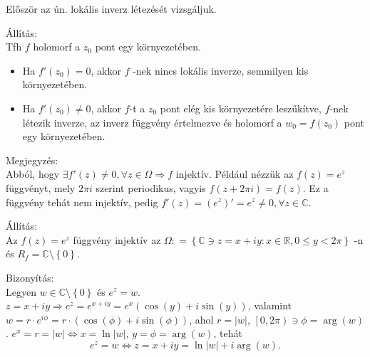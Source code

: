 \documentclass[12pt,a4paper]{scrartcl}
\providecommand{\tightlist}{%
  \setlength{\itemsep}{0pt}\setlength{\parskip}{0pt}}
\newenvironment{bizonyitas}{}{}
\newenvironment{allitas}{}{}
\newenvironment{megjegyzes}{}{}
\begin{document}
Először az ún. lokális inverz létezését vizsgáljuk.

\begin{allitas}

Állítás:\\
Tfh \(f\) holomorf a \(z_{0}\) pont egy környezetében.

\begin{itemize}
\tightlist
\item
  Ha \(f'\left( z_{0} \right) = 0\), akkor \(f\) -nek nincs lokális
  inverze, semmilyen kis környezetében.
\item
  Ha \(f'\left( z_{0} \right) \neq 0\), akkor \(f\)-t a \(z_{0}\) pont
  elég kis környezetére leszűkítve, \(f\)-nek létezik inverze, az inverz
  függvény értelmezve és holomorf a \(w_{0} = f\left( z_{0} \right)\)
  pont egy környezetében.
\end{itemize}

\end{allitas}

\begin{megjegyzes}

Megjegyzés:\\
Abból, hogy
\(\exists f'\left( z \right) \neq 0,\forall z \in \Omega\Rightarrow f\)
injektív. Például nézzük az \(f\left( z \right) = e^{z}\) függvényt,
mely \(2\pi i\) szerint periodikus, vagyis
\(f\left( {z + 2\pi i} \right) = f\left( z \right)\). Ez a függvény
tehát nem injektív, pedig
\(f'\left( z \right) = \left( e^{z} \right)' = e^{z} \neq 0,\forall z \in {\mathbb{C}}\).

\end{megjegyzes}

\begin{allitas}

Állítás:\\
Az \(f\left( z \right) = e^{z}\) függvény injektív az
\(\Omega: = \left\{ {{\mathbb{C}} \ni z = x + iy:x \in {\mathbb{R}},0 \leq y < 2\pi} \right\}\)
-n és
\(R_{f} = {\mathbb{C}}\text{\textbackslash}\left\{ \text{0} \right\}\).

\end{allitas}

\begin{bizonyitas}

Bizonyítás:\\
Legyen \(w \in {\mathbb{C}}\text{\textbackslash}\left\{ 0 \right\}\) és
\(e^{z} = w\).
\(\left. z = x + iy\Rightarrow e^{z} = e^{x + iy} = e^{x}\left( {\cos\left( y \right) + i\sin\left( y \right)} \right) \right.\),
valamint
\(w = r \cdot e^{i\phi} = r \cdot \left( {\cos\left( \phi \right) + i\sin\left( \phi \right)} \right)\),
ahol \(r = \left| w \right|\),
\(\left\lbrack {0,2\pi} \right) \ni \phi = \arg\left( w \right)\).
\(\left. e^{x} = r = \left| w \right|\Leftrightarrow x = \ln\left| w \right| \right.\),
\(y = \phi = \arg\left( w \right)\), tehát
\[\left. e^{z} = w\Leftrightarrow z = x + iy = \ln\left| w \right| + i\arg\left( w \right). \right.\]

\end{bizonyitas}
\end{document}
